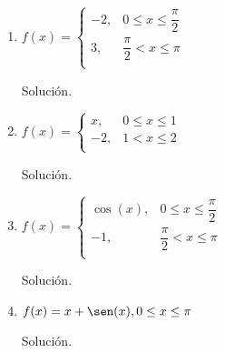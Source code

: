 \documentclass[fleqn]{article}
\begin{document}
\begin{enumerate}[I.]
\begin{enumerate}[(1)]
			\bfseries
			\item $ f(x) = \begin{cases}
				-2, & 0 \leq x \leq \dfrac{\pi}{2} \\
				3, & \dfrac{\pi}{2} < x \leq \pi \\
			\end{cases} $

			Solución.

			\normalfont



			\bfseries
			\item $ f(x) = \begin{cases}
				x, & 0 \leq x \leq 1 \\
				-2, & 1 < x \leq 2 \\
			\end{cases} $

			Solución.

			\normalfont



			\bfseries
			\item $ f(x) = \begin{cases}
				\cos (x), & 0 \leq x \leq \dfrac{\pi}{2} \\
				-1, & \dfrac{\pi}{2} < x \leq \pi \\
			\end{cases} $

			Solución.

			\normalfont



			\bfseries
			\item $ f(x) = x + \sen (x), 0 \leq x \leq \pi $
			
			Solución.

			\normalfont



		\end{enumerate}
	\end{enumerate}
\end{document}
